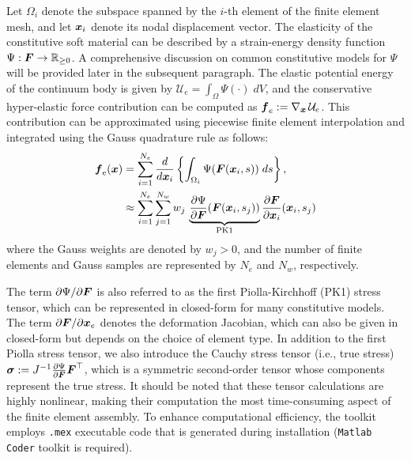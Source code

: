 \begin{intermez}
    
Let $\Omega_i$ denote the subspace spanned by the $i$-th element of the finite element mesh, and let ${\boldsymbol{x}}_i$ denote its nodal displacement vector. The elasticity of the constitutive soft material can be described by a strain-energy density function $\Psi: {\boldsymbol{F}} \to \mathbb{R}_{\ge 0}$. A comprehensive discussion on common constitutive models for $\Psi$ will be provided later in the subsequent paragraph. The elastic potential energy of the continuum body is given by $\mathcal{U}_e = \int_\Omega \Psi(\cdot) \; dV$, and the conservative hyper-elastic force contribution can be computed as ${\boldsymbol{f}}_e := \nabla_{{\boldsymbol{x}}}\,\mathcal{U}_e$. This contribution can be approximated using piecewise finite element interpolation and integrated using the Gauss quadrature rule \cite{Kim2018} as follows:
    \begin{align}
        {\boldsymbol{f}}_\textrm{e}({\boldsymbol{x}}) & = \sum_{i=1}^{N_e} \frac{d}{d{\boldsymbol{x}}_i} \left\{\int_{\Omega_i} \Psi({\boldsymbol{F}}({\boldsymbol{x}}_i,s)) \; ds\right\}, \notag                                                    \\
                           & \approx \sum_{i=1}^{N_e} \sum_{j=1}^{N_w} w_j \, \underbrace{\frac{\partial \Psi}{\partial {\boldsymbol{F}}}({\boldsymbol{F}}({\boldsymbol{x}}_i,s_j)) }_{\textrm{PK1}} \frac{\partial {\boldsymbol{F}}}{\partial {\boldsymbol{x}}_i}({\boldsymbol{x}}_i,s_j)
        \label{eq:C5:fem_hyper}
    \end{align}
where the Gauss weights are denoted by $w_j > 0$, and the number of finite elements and Gauss samples are represented by $N_e$ and $N_w$, respectively.

The term ${\partial \Psi}/{\partial {\boldsymbol{F}}}$ is also referred to as the first Piolla-Kirchhoff (PK1) stress tensor, which can be represented in closed-form for many constitutive models. The term ${\partial {\boldsymbol{F}}}/{\partial {\boldsymbol{x}}_e}$ denotes the deformation Jacobian, which can also be given in closed-form but depends on the choice of element type. In addition to the first Piolla stress tensor, we also introduce the Cauchy stress tensor (i.e., true stress) $\boldsymbol{\sigma} := J^{-1} \frac{\partial \Psi}{\partial {\boldsymbol{F}}} {\boldsymbol{F}}^\top$, which is a symmetric second-order tensor whose components represent the true stress. It should be noted that these tensor calculations are highly nonlinear, making their computation the most time-consuming aspect of the finite element assembly. To enhance computational efficiency, the toolkit employs \texttt{.mex} executable code that is generated during installation (\texttt{Matlab Coder} toolkit is required).
\end{intermez}

